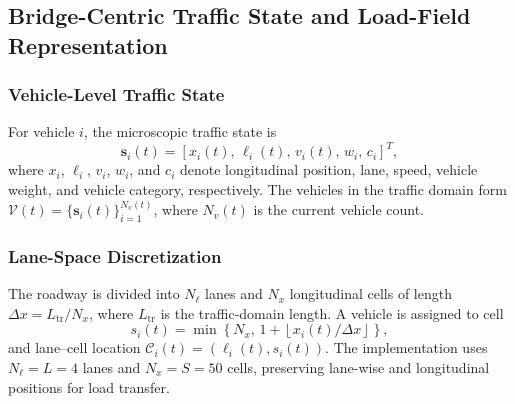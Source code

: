 \documentclass[journal]{IEEEtran}
\begin{document}
\subsection{Bridge-Centric Traffic State and Load-Field Representation}
\label{sec:traffic_state_representation}

\subsubsection{Vehicle-Level Traffic State}
\label{subsec:vehicle_state}
For vehicle $i$, the microscopic traffic state is
\begin{equation}
\mathbf{s}_i(t)=
[x_i(t),\,\ell_i(t),\,v_i(t),\,w_i,\,c_i]^{T},
\label{eq:vehicle_state}
\end{equation}
where $x_i$, $\ell_i$, $v_i$, $w_i$, and $c_i$ denote longitudinal position, lane, speed, vehicle weight, and vehicle category, respectively. The vehicles in the traffic domain form
$\mathcal{V}(t)=\{\mathbf{s}_i(t)\}_{i=1}^{N_v(t)}$, where $N_v(t)$ is the current vehicle count.

\subsubsection{Lane-Space Discretization}
\label{subsec:lane_space}
The roadway is divided into $N_\ell$ lanes and $N_x$ longitudinal cells of length $\Delta x=L_{\mathrm{tr}}/N_x$, where $L_{\mathrm{tr}}$ is the traffic-domain length. A vehicle is assigned to cell
\begin{equation}
s_i(t)=\min\!\left\{N_x,\,
1+\left\lfloor x_i(t)/\Delta x\right\rfloor\right\},
\label{eq:cell_index}
\end{equation}
and lane--cell location $\mathcal{C}_i(t)=(\ell_i(t),s_i(t))$. The implementation uses $N_\ell=L=4$ lanes and $N_x=S=50$ cells, preserving lane-wise and longitudinal positions for load transfer.
\end{document}

